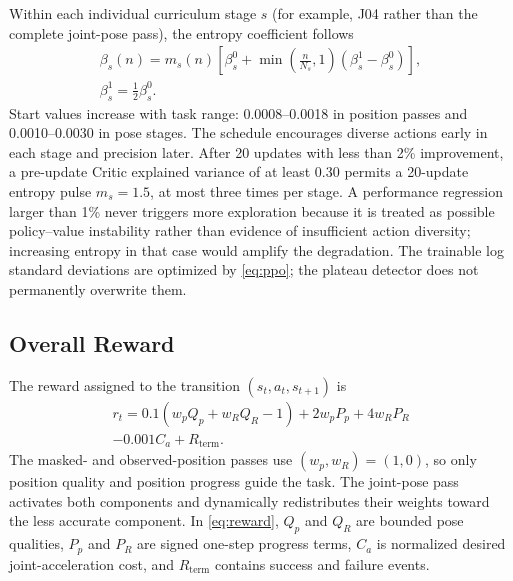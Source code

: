 \documentclass[conference]{IEEEtran}
\begin{document}
Within each individual curriculum stage $s$ (for example, J04 rather than the complete joint-pose pass), the entropy coefficient follows
\begin{equation}
\begin{gathered}
\beta_s(n)=m_s(n)\!\left[
\beta_s^{0}+
\min\!\left(\frac{n}{N_s},1\right)
(\beta_s^{1}-\beta_s^{0})
\right],\\
\beta_s^{1}=\frac{1}{2}\beta_s^{0}.
\end{gathered}
\label{eq:entropy}
\end{equation}
Start values increase with task range: 0.0008--0.0018 in position passes and 0.0010--0.0030 in pose stages. The schedule encourages diverse actions early in each stage and precision later. After 20 updates with less than 2\% improvement, a pre-update Critic explained variance of at least 0.30 permits a 20-update entropy pulse $m_s=1.5$, at most three times per stage. A performance regression larger than 1\% never triggers more exploration because it is treated as possible policy--value instability rather than evidence of insufficient action diversity; increasing entropy in that case would amplify the degradation. The trainable log standard deviations are optimized by \eqref{eq:ppo}; the plateau detector does not permanently overwrite them.

\subsection{Overall Reward}

The reward assigned to the transition $(s_t,a_t,s_{t+1})$ is
\begin{equation}
\begin{gathered}
r_t=0.1\left(w_pQ_p+w_RQ_R-1\right)
+2w_pP_p+4w_RP_R\\
-0.001C_a+R_{\mathrm{term}}.
\end{gathered}
\label{eq:reward}
\end{equation}
The masked- and observed-position passes use $(w_p,w_R)=(1,0)$, so only position quality and position progress guide the task. The joint-pose pass activates both components and dynamically redistributes their weights toward the less accurate component. In \eqref{eq:reward}, $Q_p$ and $Q_R$ are bounded pose qualities, $P_p$ and $P_R$ are signed one-step progress terms, $C_a$ is normalized desired joint-acceleration cost, and $R_{\mathrm{term}}$ contains success and failure events.
\end{document}

